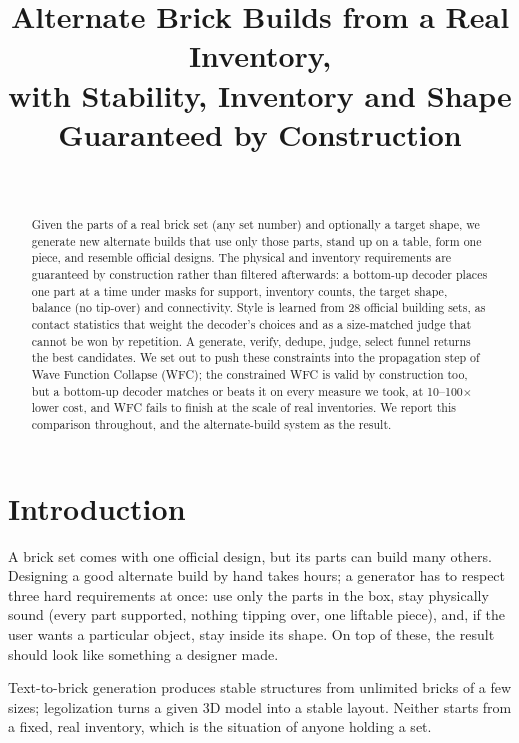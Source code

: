 \documentclass[10pt,twocolumn]{article}
\title{Alternate Brick Builds from a Real Inventory,\\ with Stability, Inventory and Shape Guaranteed by Construction}
\author{\todo{authors and affiliation}\\ \small\VENUE}
\date{}
\begin{document}
\maketitle

\begin{abstract}
Given the parts of a real brick set (any set number) and optionally a target shape, we generate new alternate
builds that use only those parts, stand up on a table, form one piece, and resemble official designs. The
physical and inventory requirements are guaranteed by construction rather than filtered afterwards: a bottom-up
decoder places one part at a time under masks for support, inventory counts, the target shape, balance (no
tip-over) and connectivity. Style is learned from 28 official building sets, as contact statistics that weight the
decoder's choices and as a size-matched judge that cannot be won by repetition. A generate, verify, dedupe, judge,
select funnel returns the best candidates. We set out to push these constraints into the propagation step of Wave
Function Collapse (WFC); the constrained WFC is valid by construction too, but a bottom-up decoder matches or beats
it on every measure we took, at 10--100$\times$ lower cost, and WFC fails to finish at the scale of real
inventories. We report this comparison throughout, and the alternate-build system as the result.
\end{abstract}

\section{Introduction}

A brick set comes with one official design, but its parts can build many others. Designing a good alternate build
by hand takes hours; a generator has to respect three hard requirements at once: use only the parts in the box,
stay physically sound (every part supported, nothing tipping over, one liftable piece), and, if the user wants a
particular object, stay inside its shape. On top of these, the result should look like something a designer made.

Text-to-brick generation \cite{pun2025brickgpt} produces stable structures from unlimited bricks of a few sizes;
legolization \cite{luo2015legolization} turns a given 3D model into a stable layout. Neither starts from a fixed,
real inventory, which is the situation of anyone holding a set.
\end{document}
